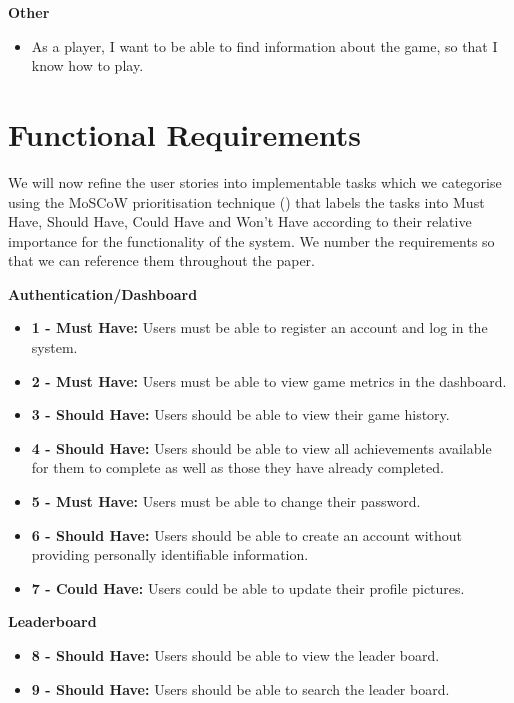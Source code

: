 \documentclass{l4proj}
\begin{document}
\textbf{Other}
\begin{itemize}
    \item As a player, I want to be able to find information about the game, so that I know how to play.
\end{itemize}

\section{Functional Requirements}
We will now refine the user stories into implementable tasks which we categorise using the MoSCoW prioritisation technique (\cite{moscow}) that labels the tasks into Must Have, Should Have, Could Have and Won't Have according to their relative importance for the functionality of the system. We number the requirements so that we can reference them throughout the paper.

\textbf{Authentication/Dashboard}
\begin{itemize}
    \item[] \textbf{1 - Must Have:} Users must be able to register an account and log in the system.
    \item[] \textbf{2 - Must Have:} Users must be able to view game metrics in the dashboard.
    \item[] \textbf{3 - Should Have:} Users should be able to view their game history.
    \item[] \textbf{4 - Should Have:} Users should be able to view all achievements available for them to complete as well as those they have already completed.
    \item[] \textbf{5 - Must Have:} Users must be able to change their password.
    \item[] \textbf{6 - Should Have:} Users should be able to create an account without providing personally identifiable information.
    \item[] \textbf{7 - Could Have:} Users could be able to update their profile pictures.
\end{itemize}

\textbf{Leaderboard}
\begin{itemize}
    \item[] \textbf{8 - Should Have:} Users should be able to view the leader board.
    \item[] \textbf{9 - Should Have:} Users should be able to search the leader board.
\end{itemize}
\end{document}
